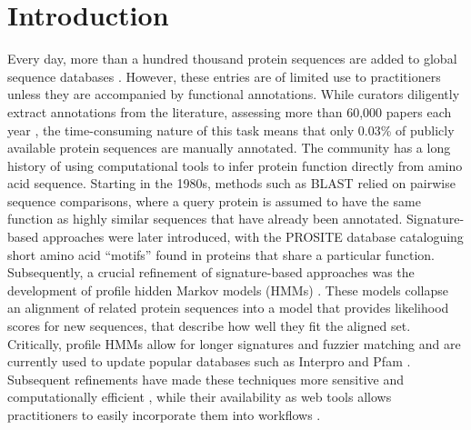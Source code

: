 \DIFdelbegin %


\DIFdelend \section*{Introduction}
Every day, more than a hundred thousand protein sequences are added to global sequence databases \cite{tremblstats}. However, these entries are of limited use to practitioners unless they are accompanied by functional annotations. While curators diligently extract annotations from the literature, assessing more than 60,000 papers each year \cite{uniprotlatest}, the time-consuming nature of this task means that only 0.03\% of publicly available protein sequences are manually annotated.
The community has a long history of using computational tools to infer protein function directly from amino acid sequence. Starting in the 1980s, methods such as BLAST \cite{blast} relied on pairwise sequence comparisons, where a query protein is assumed to have the same function as highly similar sequences that have already been annotated. Signature-based approaches were later introduced, with the PROSITE database \cite{bairoch1991prosite} cataloguing short amino acid ``motifs'' found in proteins that share a particular function. Subsequently, a crucial refinement of signature-based approaches was the development of profile hidden Markov models (HMMs) \cite{krogh1994hidden, eddyhmmreview}. These models collapse an alignment of related protein sequences into a model that provides likelihood scores for new sequences, that describe how well they fit the aligned set. Critically, profile HMMs allow for longer signatures and fuzzier matching and are currently used to update popular databases such as Interpro and Pfam \cite{pfamlatest, blum2021interpro}. Subsequent refinements have made these techniques more sensitive and computationally efficient \cite{altschul1997gapped, fasterhmmer, pfamlatest, soding2005protein, steinegger2019hh}, while their availability as web tools allows practitioners to easily incorporate them into workflows \cite{johnson2008ncbi, soding2005hhpred, potter2018hmmer, bernhofer2021predictprotein}.
